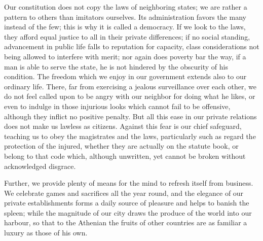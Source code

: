 \documentclass[a4paper]{amsbook}
\begin{document}
Our constitution does not copy the laws of neighboring states; we are rather a pattern to others than imitators ourselves. Its administration favors the many instead of the few; this is why it is called a democracy. If we look to the laws, they afford equal justice to all in their private differences; if no social standing, advancement in public life falls to reputation for capacity, class considerations not being allowed to interfere with merit; nor again does poverty bar the way, if a man is able to serve the state, he is not hindered by the obscurity of his condition. The freedom which we enjoy in our government extends also to our ordinary life. There, far from exercising a jealous surveillance over each other, we do not feel called upon to be angry with our neighbor for doing what he likes, or even to indulge in those injurious looks which cannot fail to be offensive, although they inflict no positive penalty. But all this ease in our private relations does not make us lawless as citizens. Against this fear is our chief safeguard, teaching us to obey the magistrates and the laws, particularly such as regard the protection of the injured, whether they are actually on the statute book, or belong to that code which, although unwritten, yet cannot be broken without acknowledged disgrace.

Further, we provide plenty of means for the mind to refresh itself from business. We celebrate games and sacrifices all the year round, and the elegance of our private establishments forms a daily source of pleasure and helps to banish the spleen; while the magnitude of our city draws the produce of the world into our harbour, so that to the Athenian the fruits of other countries are as familiar a luxury as those of his own.
\end{document}
